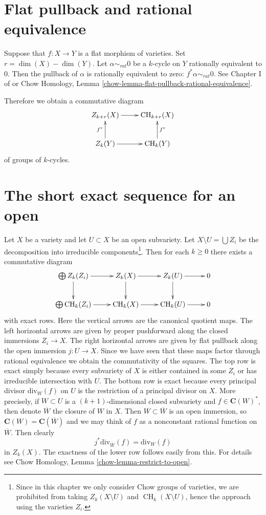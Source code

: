 \documentclass{stacks-project}
\theoremstyle{plain}
\theoremstyle{definition}
\theoremstyle{remark}
\numberwithin{equation}{subsection}
\def\CH{\mathop{\mathrm{CH}}\nolimits}
\begin{document}
\section{Flat pullback and rational equivalence}
\label{section-flat-pullback-and-rational-equivalence}

\noindent
Suppose that $f : X \to Y$ is a flat morphism of varieties.
Set $r = \dim(X) - \dim(Y)$.
Let $\alpha \sim_{rat} 0$ be a $k$-cycle on
$Y$ rationally equivalent to $0$. Then the pullback
of $\alpha$ is rationally equivalent to zero:
$f^* \alpha \sim_{rat} 0$. See Chapter I of \cite{F} or
Chow Homology, Lemma \ref{chow-lemma-flat-pullback-rational-equivalence}.

\medskip\noindent
Therefore we obtain a commutative diagram
$$
\xymatrix{
Z_{k + r}(X) \ar[r] & \CH_{k + r}(X) \\
Z_k(Y) \ar[r] \ar[u]^{f^*} & \CH_k(Y) \ar[u]_{f^*}
}
$$
of groups of $k$-cycles.


\section{The short exact sequence for an open}
\label{section-ses}

\noindent
Let $X$ be a variety and let $U \subset X$ be an open subvariety.
Let $X \setminus U = \bigcup Z_i$ be the decomposition into irreducible
components\footnote{Since in this chapter we only consider Chow groups
of varieties, we are prohibited from taking $Z_k(X \setminus U)$
and $\CH_k(X \setminus U)$, hence the approach using the varieties $Z_i$.}.
Then for each $k \geq 0$ there exists a commutative diagram
$$
\xymatrix{
\bigoplus Z_k(Z_i) \ar[r] \ar[d] &
Z_k(X) \ar[r] \ar[d] &
Z_k(U) \ar[d] \ar[r] &
0 \\
\bigoplus \CH_k(Z_i) \ar[r] &
\CH_k(X) \ar[r] &
\CH_k(U) \ar[r] &
0
}
$$
with exact rows. Here the vertical arrows are the canonical quotient maps.
The left horizontal arrows are given by proper pushforward along the closed
immersions $Z_i \to X$. The right horizontal arrows are given by flat
pullback along the open immersion $j : U \to X$. Since we have seen that
these maps factor through rational equivalence we obtain the commutativity
of the squares. The top row is exact simply because every subvariety
of $X$ is either contained in some $Z_i$ or has irreducible intersection
with $U$. The bottom row is exact because every principal divisor
$\text{div}_W(f)$ on $U$ is the restriction of a principal divisor on $X$.
More precisely, if $W \subset U$ is a $(k + 1)$-dimensional closed subvariety
and $f \in \mathbf{C}(W)^*$, then denote $\overline{W}$ the closure of $W$
in $X$. Then $W \subset \overline{W}$ is an open immersion, so
$\mathbf{C}(W) = \mathbf{C}(\overline{W})$ and we may think of $f$
as a nonconstant rational function on $\overline{W}$. Then clearly
$$
j^*\text{div}_{\overline{W}}(f) = \text{div}_W(f)
$$
in $Z_k(X)$. The exactness of the lower row follows easily from this.
For details see Chow Homology, Lemma \ref{chow-lemma-restrict-to-open}.
\end{document}
